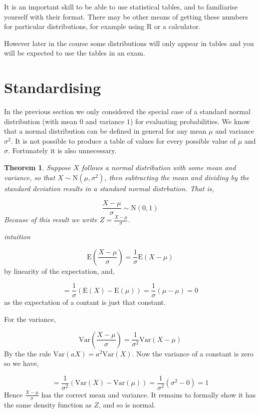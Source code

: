 \documentclass[
]{book}
\newtheorem{theorem}{Theorem}[chapter]
\theoremstyle{definition}
\theoremstyle{definition}
\theoremstyle{definition}
\theoremstyle{definition}
\theoremstyle{remark}
\begin{document}
It is an important skill to be able to use statistical tables, and to familiarise yourself with their format. There may be other means of getting these numbers for particular distributions, for example using R or a calculator.

However later in the course some distributions will only appear in tables and you will be expected to use the tables in an exam.

\hypertarget{standardising}{%
\section{Standardising}\label{standardising}}

In the previous section we only considered the special case of a standard normal distribution (with mean \(0\) and variance \(1\)) for evaluating probabilities. We know that a normal distribution can be defined in general for any mean \(\mu\) and variance \(\sigma^2\). It is not possible to produce a table of values for every possible value of \(\mu\) and \(\sigma\). Fortunately it is also unnecessary.

\begin{theorem}
Suppose \(X\) follows a normal distribution with some mean and variance, so that \(X\sim \text{N}(\mu,\sigma^2)\), then subtracting the mean and dividing by the standard deviation results in a standard normal distrbution. That is,

\[\frac{X-\mu}{\sigma} \sim \text{N}(0,1) \]
Because of this result we write \(Z=\frac{X-\mu}{\sigma}\).
\end{theorem}

\emph{intuition}

\[\text{E}\left(\frac{X-\mu}{\sigma}\right)=\frac{1}{\sigma}\text{E}(X-\mu) \]
by linearity of the expectation, and,

\[ = \frac{1}{\sigma}(\text{E}(X) - \text{E}(\mu)) = \frac{1}{\sigma}(\mu-\mu)=0\]
as the expectation of a contant is just that constant.

For the variance,

\[ \text{Var} \left( \frac{X-\mu}{\sigma} \right) = \frac{1}{\sigma^2}\text{Var}(X-\mu)\]
By the the rule \(\text{Var}(aX)=a^2\text{Var}(X)\). Now the variance of a constant is zero so we have,

\[= \frac{1}{\sigma^2}\left( \text{Var}(X) - \text{Var}(\mu) \right) = \frac{1}{\sigma^2}\left( \sigma^2 - 0\right) = 1\]
Hence \(\frac{X-\mu}{\sigma}\) has the correct mean and variance. It remains to formally show it has the same density function as \(Z\), and so is normal.
\end{document}
